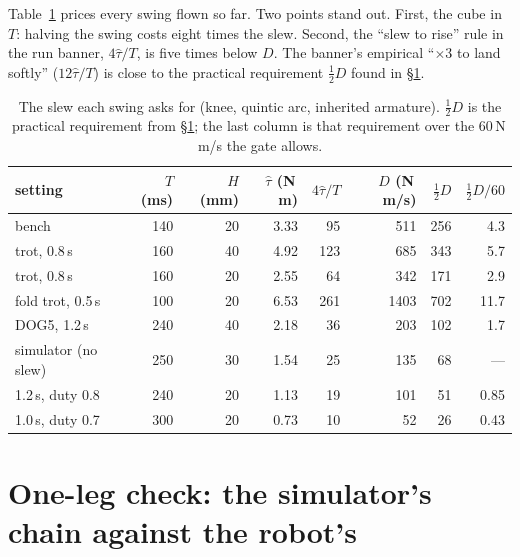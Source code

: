 \documentclass[11pt,a4paper]{article}
\newcommand{\Nms}{\,N\,m/s}
\begin{document}
Table~\ref{tab:budget} prices every swing flown so far. Two points stand out.
First, the cube in $T$: halving the swing costs eight times the slew.
Second, the ``slew to rise'' rule in the run banner, $4\hat\tau/T$, is five
times below $D$. The banner's empirical ``$\times3$ to land softly''
($12\hat\tau/T$) is close to the practical requirement $\tfrac12 D$ found in
\S\ref{sec:oneleg}.

\begin{table}[htbp]
\centering
\caption{The slew each swing asks for (knee, quintic arc, inherited armature).
$\tfrac12 D$ is the practical requirement from \S\ref{sec:oneleg}; the last
column is that requirement over the 60\Nms{} the gate allows.}
\label{tab:budget}
\small
\begin{tabular}{@{}lrrrrrrr@{}}
\toprule
setting & $T$ (ms) & $H$ (mm) & $\hat\tau$ (N\,m) & $4\hat\tau/T$ & $D$ (N\,m/s) & $\tfrac12 D$ & $\tfrac12 D / 60$ \\
\midrule
bench & 140 & 20 & 3.33 & 95 & 511 & 256 & \textcolor{bad}{4.3} \\
trot, 0.8\,s & 160 & 40 & 4.92 & 123 & 685 & 343 & \textcolor{bad}{5.7} \\
trot, 0.8\,s & 160 & 20 & 2.55 & 64 & 342 & 171 & \textcolor{bad}{2.9} \\
fold trot, 0.5\,s & 100 & 20 & 6.53 & 261 & 1403 & 702 & \textcolor{bad}{11.7} \\
DOG5, 1.2\,s & 240 & 40 & 2.18 & 36 & 203 & 102 & \textcolor{bad}{1.7} \\
\midrule
simulator (no slew) & 250 & 30 & 1.54 & 25 & 135 & 68 & --- \\
1.2\,s, duty 0.8 & 240 & 20 & 1.13 & 19 & 101 & 51 & \textcolor{good}{0.85} \\
1.0\,s, duty 0.7 & 300 & 20 & 0.73 & 10 & 52 & 26 & \textcolor{good}{0.43} \\
\bottomrule
\end{tabular}
\end{table}

\section{One-leg check: the simulator's chain against the robot's}
\label{sec:oneleg}
\end{document}
